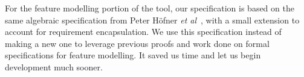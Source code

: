 For the feature modelling portion of the tool, our specification is based on the same algebraic specification from Peter H\"{o}fner \textit{et al}~\cite{hofner2006feature,hofner2011algebra}, with a small extension to account for requirement encapsulation. We use this specification instead of making a new one to leverage previous proofs and work done on formal specifications for feature modelling. It saved us time and let us begin development much sooner. 

